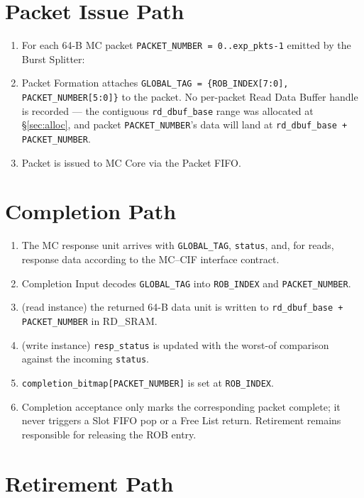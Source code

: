 \section{Packet Issue Path}
\label{sec:issue}

\begin{enumerate}[noitemsep]
  \item For each 64-B MC packet \texttt{PACKET\_NUMBER = 0..exp\_pkts-1} emitted by the Burst Splitter:
  \item Packet Formation attaches \texttt{GLOBAL\_TAG = \{ROB\_INDEX[7:0], PACKET\_NUMBER[5:0]\}} to the packet. No per-packet Read Data Buffer handle is recorded --- the contiguous \texttt{rd\_dbuf\_base} range was allocated at \S\ref{sec:alloc}, and packet \texttt{PACKET\_NUMBER}'s data will land at \texttt{rd\_dbuf\_base + PACKET\_NUMBER}.
  \item Packet is issued to MC Core via the Packet FIFO.
\end{enumerate}

\section{Completion Path}
\label{sec:completion}

\begin{enumerate}[noitemsep]
  \item The MC response unit arrives with \texttt{GLOBAL\_TAG},
      \texttt{status}, and, for reads, response data according to
      the MC--CIF interface contract.
  \item Completion Input decodes \texttt{GLOBAL\_TAG} into \texttt{ROB\_INDEX} and \texttt{PACKET\_NUMBER}.
  \item (read instance) the returned 64-B data unit is written to \texttt{rd\_dbuf\_base + PACKET\_NUMBER} in RD\_SRAM.
  \item (write instance) \texttt{resp\_status} is updated with the worst-of comparison against the incoming \texttt{status}.
  \item \texttt{completion\_bitmap[PACKET\_NUMBER]} is set at \texttt{ROB\_INDEX}.
  \item Completion acceptance only marks the corresponding packet
      complete; it never triggers a Slot FIFO pop or a Free List return.
      Retirement remains responsible for releasing the ROB entry.
\end{enumerate}

\section{Retirement Path}

